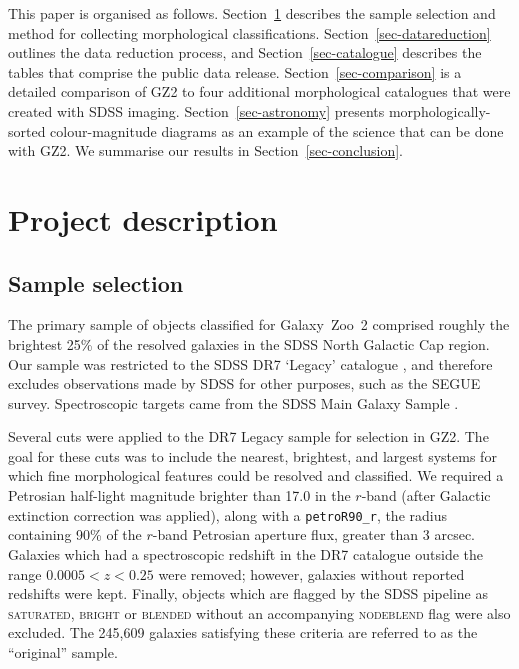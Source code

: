 \documentclass[useAMS,usenatbib]{mn2e}
\begin{document}
This paper is organised as follows. Section~\ref{sec-description} describes the sample selection and method for collecting morphological classifications. Section~\ref{sec-datareduction} outlines the data reduction process, and Section~\ref{sec-catalogue} describes the tables that comprise the public data release. Section~\ref{sec-comparison} is a detailed comparison of GZ2 to four additional morphological catalogues that were created with SDSS imaging. Section~\ref{sec-astronomy} presents morphologically-sorted colour-magnitude diagrams as an example of the science that can be done with GZ2. We summarise our results in Section~\ref{sec-conclusion}. 



\section{Project description} \label{sec-description}

\subsection{Sample selection} \label{ssec-sample}
The primary sample of objects classified for Galaxy~Zoo~2 comprised roughly the brightest 25\% of the resolved galaxies in the SDSS North Galactic Cap region. Our sample was restricted to the SDSS DR7 `Legacy' catalogue \citep{aba09}, and therefore excludes observations made by SDSS for other purposes, such as the SEGUE survey. Spectroscopic targets came from the SDSS Main Galaxy Sample \citep{str02}.

Several cuts were applied to the DR7 Legacy sample for selection in GZ2. The goal for these cuts was to include the nearest, brightest, and largest systems for which fine morphological features could be resolved and classified. We required a Petrosian half-light magnitude brighter than 17.0 in the $r$-band (after Galactic extinction correction was applied), along with a {\tt petroR90\_r}, the radius containing 90\% of the $r$-band Petrosian aperture flux, greater than 3 arcsec. Galaxies which had a spectroscopic redshift in the DR7 catalogue outside the range $0.0005<z<0.25$ were removed; however, galaxies without reported redshifts were kept. Finally, objects which are flagged by the SDSS pipeline as \textsc{saturated}, \textsc{bright} or \textsc{blended} without an accompanying \textsc{nodeblend} flag were also excluded. The 245,609 galaxies satisfying these criteria are referred to as the ``original'' sample.  
\end{document}
